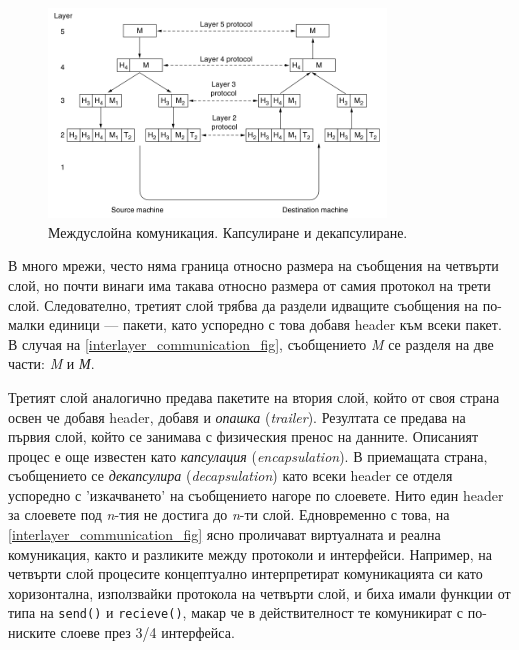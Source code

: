 \documentclass[12pt,a4paper,oneside]{book}
\begin{document}
\begin{figure}[h!]
  \centering
  \includegraphics[width=0.8\textwidth]{figures/interlayer_communication.png}
  \caption{Междуслойна комуникация. Капсулиране и декапсулиране.}
  \label{interlayer_communication_fig}
\end{figure}

В много мрежи, често няма граница относно размера на съобщения на четвърти слой,
но почти винаги има такава относно размера от самия протокол на трети слой.
Следователно, третият слой трябва да раздели идващите съобщения на по-малки
единици --- пакети, като успоредно с това добавя header към всеки пакет. В
случая на \autoref{interlayer_communication_fig}, съобщението \textit{M} се
разделя на две части: \textit{M} и
\textit{М}.

Третият слой аналогично предава пакетите на втория слой, който от своя страна
освен че добавя header, добавя и \textit{опашка} (\textit{trailer}). Резултата
се предава на първия слой, който се занимава с физическия пренос на данните.
Описаният процес е още известен като \textit{капсулация} (\textit{encapsulation}). В
приемащата страна, съобщението се \textit{декапсулира} (\textit{decapsulation}) като
всеки header се отделя успоредно с 'изкачването' на съобщението нагоре по
слоевете. Нито един header за слоевете под \textit{n}-тия не достига до
\textit{n}-ти слой. Едновременно с това, на
\autoref{interlayer_communication_fig} ясно проличават виртуалната и реална
комуникация, както и разликите между протоколи и интерфейси. Например, на
четвърти слой процесите концептуално интерпретират комуникацията си като
хоризонтална, използвайки протокола на четвърти слой, и биха имали функции от типа
на \texttt{send()} и \texttt{recieve()}, макар че в действителност те
комуникират с по-ниските слоеве през 3/4 интерфейса.

\vfill
\end{document}
